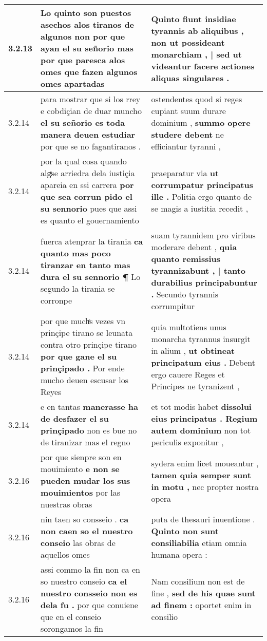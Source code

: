 \begin{tabular}{|p{1cm}|p{6.5cm}|p{6.5cm}|}
3.2.13 & Lo quinto son puestos asechos alos tiranos de algunos non \textbf{ por que ayan el su señorio mas por que paresca alos omes } que fazen algunos omes apartadas & Quinto fiunt insidiae tyrannis ab aliquibus , \textbf{ non ut possideant monarchiam , | sed ut videantur } facere actiones aliquas singulares . \\\hline
3.2.14 & para mostrar que si los rrey e cobdiçian de duar muncho \textbf{ el su señorio es toda manera deuen estudiar } por que se no fagantiranos . & ostendentes quod si reges cupiant suum durare dominium , \textbf{ summo opere studere debent } ne efficiantur tyranni , \\\hline
3.2.14 & por la qual cosa quando algͤse arriedra dela iustiçia apareia en ssi carrera \textbf{ por que sea corrun pido el su sennorio } pues que assi es quanto el gouernamiento & praeparatur via \textbf{ ut corrumpatur principatus ille . } Politia ergo quanto de se magis a iustitia recedit , \\\hline
3.2.14 & fuerca atenprar la tirania \textbf{ ca quanto mas poco tiranzar en tanto mas dura el su sennorio ¶ } Lo segundo la tirania se corronpe & suam tyrannidem pro viribus moderare debent , \textbf{ quia quanto remissius tyrannizabunt , | tanto durabilius principabuntur . } Secundo tyrannis corrumpitur \\\hline
3.2.14 & por que muchͣs vezes vn prinçipe tirano se leunata contra otro prinçipe tirano \textbf{ por que gane el su prinçipado . } Por ende mucho deuen escusar los Reyes & quia multotiens unus monarcha tyrannus insurgit in alium , \textbf{ ut obtineat principatum eius . } Debent ergo cauere Reges et Principes ne tyranizent , \\\hline
3.2.14 & e en tantas \textbf{ manerasse ha de desfazer el su prinçipado } non es bue no de tiranizar mas el regno & et tot modis habet \textbf{ dissolui eius principatus . Regium autem dominium } non tot periculis exponitur , \\\hline
3.2.16 & por que sienpre son en mouimiento \textbf{ e non se pueden mudar los sus mouimientos } por las nuestras obras & sydera enim licet moueantur , \textbf{ tamen quia semper sunt in motu , } nec propter nostra opera \\\hline
3.2.16 & nin taen so consseio . \textbf{ ca non caen so el nuestro conseio } las obras de aquellos omes & puta de thesauri inuentione . \textbf{ Quinto non sunt consiliabilia } etiam omnia humana opera : \\\hline
3.2.16 & assi commo la fin non ca en so nuestro conseio \textbf{ ca el nuestro consseio non es dela fu . } por que conuiene que en el conseio sorongamos la fin & Nam consilium non est de fine , \textbf{ sed de his quae sunt ad finem : } oportet enim in consilio \\\hline

\end{tabular}
